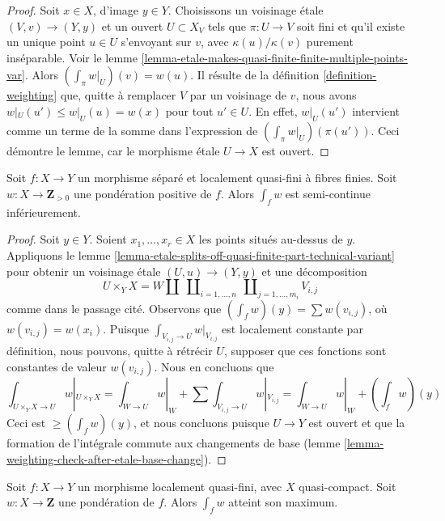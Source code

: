 \begin{proof}
Soit $x \in X$, d'image $y \in Y$. Choisissons un voisinage \'etale
$(V, v) \to (Y, y)$ et un ouvert $U \subset X_V$ tels que
$\pi : U \to V$ soit fini et qu'il existe un unique point $u \in U$
s'envoyant sur $v$, avec $\kappa(u)/\kappa(v)$ purement inséparable.
Voir le lemme \ref{lemma-etale-makes-quasi-finite-finite-multiple-points-var}.
Alors $(\int_\pi w|_U)(v) = w(u)$.
Il résulte de la définition \ref{definition-weighting}
que, quitte à remplacer $V$ par un voisinage de $v$, nous
avons $w|_U(u') \leq w|_U(u) = w(x)$ pour tout $u' \in U$.
En effet, $w|_U(u')$ intervient comme un terme de la somme dans l'expression
de $(\int_\pi w|_U)(\pi(u'))$.
Ceci démontre le lemme, car le morphisme \'etale
$U \to X$ est ouvert.
\end{proof}

\begin{lemma}
\label{lemma-semicontinuous-int-w}
Soit $f : X \to Y$ un morphisme séparé et localement quasi-fini
à fibres finies.
Soit $w : X \to \mathbf{Z}_{> 0}$ une pondération positive de $f$.
Alors $\int_f w$ est semi-continue inférieurement.
\end{lemma}

\begin{proof}
Soit $y \in Y$. Soient $x_1, \ldots, x_r \in X$ les points situés au-dessus de $y$.
Appliquons le
lemme \ref{lemma-etale-splits-off-quasi-finite-part-technical-variant}
pour obtenir un voisinage \'etale $(U, u) \to (Y, y)$ et une décomposition
$$
U \times_Y X =
W \amalg
\ \coprod\nolimits_{i = 1, \ldots, n}
\ \coprod\nolimits_{j = 1, \ldots, m_i}
V_{i, j}
$$
comme dans le passage cité. Observons que $(\int_f w)(y) = \sum w(v_{i, j})$,
où $w(v_{i, j}) = w(x_i)$. Puisque $\int_{V_{i, j} \to U} w|_{V_{i, j}}$
est localement constante par définition, nous pouvons, quitte à rétrécir $U$,
supposer que ces fonctions sont constantes de valeur $w(v_{i, j})$.
Nous en concluons que
$$
\textstyle{\int}_{U \times_Y X \to U} w|_{U \times_Y X} =
\textstyle{\int}_{W \to U} w|_W +
\sum \textstyle{\int}_{V_{i, j} \to U} w|_{V_{i, j}} =
\textstyle{\int}_{W \to U} w|_W + (\int_f w)(y)
$$
Ceci est $\geq (\int_f w)(y)$, et nous concluons puisque $U \to Y$
est ouvert et que la formation de l'intégrale commute aux changements de base
(lemme \ref{lemma-weighting-check-after-etale-base-change}).
\end{proof}

\begin{lemma}
\label{lemma-max-int-w}
Soit $f : X \to Y$ un morphisme localement quasi-fini,
avec $X$ quasi-compact. Soit $w : X \to \mathbf{Z}$ une pondération de $f$.
Alors $\int_f w$ atteint son maximum.
\end{lemma}

